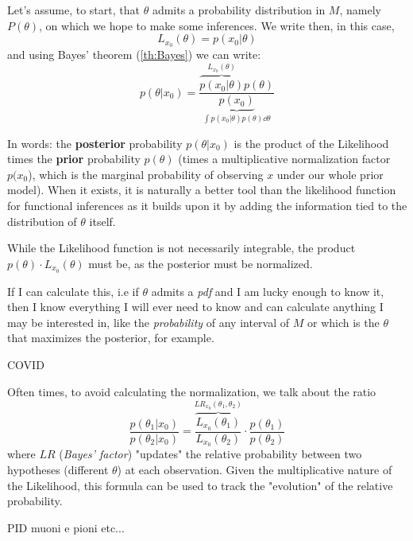 Let's assume, to start, that $\theta$ admits a probability distribution in $M$, namely $P(\theta)$, on which we hope to make some inferences. We write then, in this case,
	\[
	L_{x_0}(\theta)=p(x_0|\theta)
	\]
and using Bayes' theorem (\ref{th:Bayes}) we can write:
	\begin{equation}
	p(\theta|x_0) = \frac{\overbrace{p(x_0|\theta)}^{L_{x_0}(\theta)}p(\theta)}{\underbrace{p(x_0)}_{\int p(x_0|\theta)p(\theta)\dd\theta}}
	\label{def:posterior}
	\end{equation}
 
 In words: the \textbf{posterior} probability $p(\theta|x_0)$ is the product of the Likelihood times the \textbf{prior} probability $p(\theta)$ (times a multiplicative normalization factor $p(x_0$), which is the marginal probability of observing $x$ under our whole prior model). When it exists, it is naturally a better tool than the likelihood function for functional inferences as it builds upon it by adding the information tied to the distribution of $\theta$ itself. 
 
 While the Likelihood function is not necessarily integrable, the product $p(\theta)\cdot L_{x_0}(\theta)$ must be, as the posterior must be normalized. 
 
 
 If I can calculate this, i.e if $\theta$ admits a \emph{pdf} and I am lucky enough to know it, then I know everything I will ever need to know and can calculate anything I may be interested in, like the \emph{probability} of any interval of $M$ or which is the $\theta$ that maximizes the posterior, for example. 
 
 \begin{example}
 	COVID
 \end{example}
 
 Often times, to avoid calculating the normalization, we talk about the ratio
 	\[
 	\frac{p(\theta_1|x_0)}{p(\theta_2|x_0)} = \overbrace{\frac{L_{x_0}(\theta_1)}{L_{x_0}(\theta_2)}}^{LR_{x_0}(\theta_1,\theta_2)} \cdot \frac{p(\theta_1)}{p(\theta_2)}
 	\]
 where $LR$ (\emph{Bayes' factor}) "updates" the relative probability between two hypotheses (different $\theta$) at each observation. Given the multiplicative nature of the Likelihood, this formula can be used to track the "evolution" of the relative probability. 
 
 \begin{example}
 	PID muoni e pioni etc...
 \end{example}

